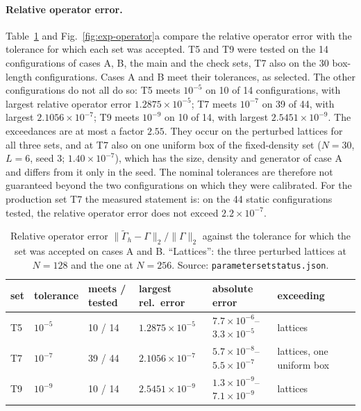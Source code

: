 \documentclass[11pt]{article}
\theoremstyle{plain}
\DeclareRobustCommand{\_}{\textunderscore\allowbreak}
\begin{document}
\paragraph{Relative operator error.}
Table~\ref{tab:exp-status} and Fig.~\ref{fig:exp-operator}a compare the
relative operator error with the tolerance for which each set was accepted.
T5 and T9 were tested on the 14 configurations of cases A, B, the main and the
check sets, T7 also on the 30 box-length configurations. Cases A and B meet
their tolerances, as selected. The other configurations do not all do so: T5
meets $10^{-5}$ on 10 of 14 configurations, with largest relative operator
error $1.2875\times10^{-5}$; T7 meets $10^{-7}$ on 39 of 44, with largest
$2.1056\times10^{-7}$; T9 meets $10^{-9}$ on 10 of 14, with largest
$2.5451\times10^{-9}$. The exceedances are at most a factor $2.55$. They occur
on the perturbed lattices for all three sets, and at T7 also on one uniform
box of the fixed-density set ($N=30$, $L=6$, seed 3; $1.40\times10^{-7}$),
which has the size, density and generator of case A and differs from it only
in the seed. The nominal tolerances are therefore not guaranteed beyond the
two configurations on which they were calibrated. For the production set T7
the measured statement is: on the 44 static configurations tested, the
relative operator error does not exceed $2.2\times10^{-7}$.

\begin{table}[htbp]
\centering
\small
\begin{tabular}{lllllll}
\toprule
set & tolerance & meets / tested & largest rel.\ error & absolute error & exceeding \\
\midrule
T5 & $10^{-5}$ & 10 / 14 & $1.2875\times10^{-5}$ & $7.7\times10^{-6}$--$3.3\times10^{-5}$ & lattices \\
T7 & $10^{-7}$ & 39 / 44 & $2.1056\times10^{-7}$ & $5.7\times10^{-8}$--$5.5\times10^{-7}$ & lattices, one uniform box \\
T9 & $10^{-9}$ & 10 / 14 & $2.5451\times10^{-9}$ & $1.3\times10^{-9}$--$7.1\times10^{-9}$ & lattices \\
\bottomrule
\end{tabular}
\caption{Relative operator error $\|\widetilde\Gamma_h-\Gamma\|_2/\|\Gamma\|_2$ against the tolerance for which the set was
accepted on cases A and B. ``Lattices'': the three perturbed lattices at $N=128$ and the one at $N=256$. Source:
\texttt{parameter\_set\_status.json}.}
\label{tab:exp-status}
\end{table}
\end{document}
